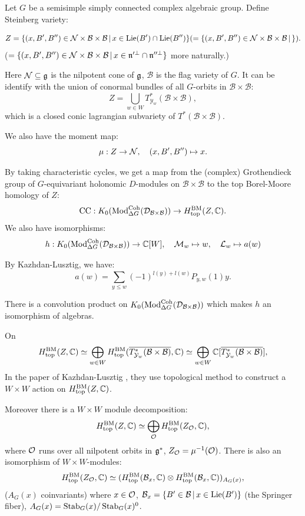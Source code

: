 Let $G$ be a semisimple simply connected complex algebraic group. Define Steinberg variety:

\[
    Z = \{(x,B',B'') \in \mathcal{N} \times \mathcal{B} \times \mathcal{B}\,|\,x \in \operatorname{Lie}(B') \cap \operatorname{Lie}(B'')\} (= \{(x,B',B'') \in \mathcal{N} \times \mathcal{B} \times \mathcal{B}\,|\,\}).
\]
($= \{(x,B',B'') \in \mathcal{N} \times \mathcal{B} \times \mathcal{B}\,|\,x \in \mathfrak{n}'^{\perp} \cap \mathfrak{n}''^{\perp}\}$ more naturally.)

Here $\mathcal{N} \subseteq \mathfrak{g}$ is the nilpotent cone of $\mathfrak{g}$, $\mathcal{B}$ is the flag variety of $G$.
It can be identify with the union of conormal bundles of all $G$-orbits in $\mathcal{B} \times \mathcal{B}$:
\[Z = \bigcup_{w \in W} T^*_{\mathcal{Y}_w}(\mathcal{B} \times \mathcal{B}),\]
which is a closed conic lagrangian subvariety of $T^*(\mathcal{B} \times \mathcal{B})$.

We also have the moment map:
\[\mu : Z \to \mathcal{N}, \quad (x,B',B'') \mapsto x.\]

By taking characteristic cycles, we get a map from the (complex) Grothendieck group of $G$-equivariant holonomic $D$-modules on $\mathcal{B} \times \mathcal{B}$ to the top Borel-Moore homology of $Z$:
\[\mathrm{CC} : K_0(\mathrm{Mod}^{\operatorname{Coh}}_{\Delta G}(\mathcal{D}_{\mathcal{B} \times \mathcal{B}})) \to H_{\mathrm{top}}^{\mathrm{BM}}(Z,\mathbb{C}).\]
We also have isomorphisms:
\[
  h: K_0(\mathrm{Mod}^{\operatorname{Coh}}_{\Delta G}(\mathcal{D}_{\mathcal{B} \times \mathcal{B}})) \to \mathbb{C}[W], \quad \mathcal{M}_w \mapsto w, \quad \mathcal{L}_w \mapsto a(w)
\]

By Kazhdan-Lusztig, we have:
\[
  a(w) = \sum_{y \leq w} (-1)^{l(y)+l(w)}P_{y,w}(1) y.
\]

There is a convolution product on $K_0(\mathrm{Mod}^{\operatorname{Coh}}_{\Delta G}(\mathcal{D}_{\mathcal{B} \times \mathcal{B}}))$ which makes $h$ an isomorphism of algebras.

On \[H_{\mathrm{top}}^{\mathrm{BM}}(Z,\mathbb{C}) \simeq \bigoplus_{w \in W} H_{\mathrm{top}}^{\mathrm{BM}}(\overline{T^*_{\mathcal{Y}_w}(\mathcal{B} \times \mathcal{B})},\mathbb{C}) \simeq \bigoplus_{w \in W} \mathbb{C}[\overline{T^*_{\mathcal{Y}_w}(\mathcal{B} \times \mathcal{B})}],\]
In the paper of Kazhdan-Lusztig \cite{KL80}, they use topological method to construct a $W \times W$ action on $H_{\mathrm{top}}^{\mathrm{BM}}(Z,\mathbb{C})$.

Moreover there is a $W \times W$ module decomposition:
\[H_{\mathrm{top}}^{\mathrm{BM}}(Z,\mathbb{C}) \simeq \bigoplus_{\mathcal{O}} H^{\mathrm{BM}}_{\mathrm{top}}(Z_{\mathcal{O}},\mathbb{C}),\]
where $\mathcal{O}$ runs over all nilpotent orbits in $\mathfrak{g}^*$, $Z_{\mathcal{O}} = \mu^{-1}(\mathcal{O})$.
There is also an isomorphism of $W \times W$-modules:
\[
H^{\mathrm{BM}}_{\mathrm{top}}(Z_{\mathcal{O}},\mathbb{C}) \simeq (H^{\mathrm{BM}}_{\mathrm{top}}(\mathcal{B}_x,\mathbb{C}) \otimes H^{\mathrm{BM}}_{\mathrm{top}}(\mathcal{B}_x,\mathbb{C}))_{A_G(x)},\]
($A_G(x)$ coinvariants) where $x \in \mathcal{O}$, $\mathcal{B}_x = \{B' \in \mathcal{B}\,|\,x \in \operatorname{Lie}(B')\}$ (the Springer fiber), $A_G(x) = \operatorname{Stab}_G(x)/\operatorname{Stab}_G(x)^0$.

